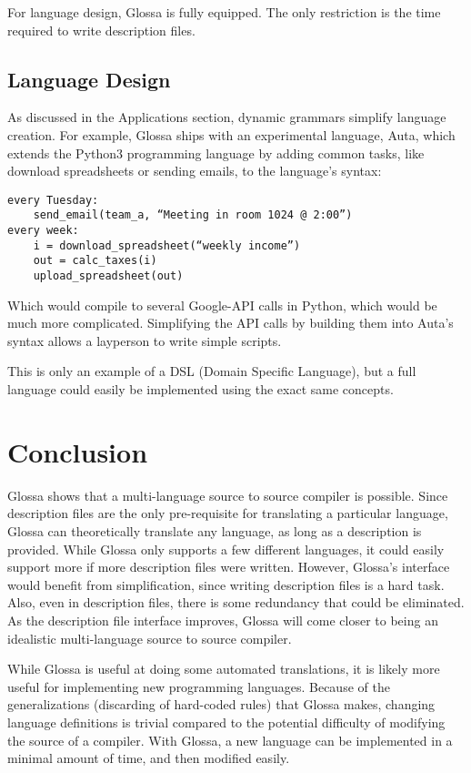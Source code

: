\documentclass{article}
\begin{document}
For language design, Glossa is fully equipped. The only restriction is the time required to write description files.

\subsection{Language Design}

As discussed in the Applications section, dynamic grammars simplify language creation.
For example, Glossa ships with an experimental language, Auta, which extends the Python3 programming language by adding common tasks, like download spreadsheets or sending emails, to the language's syntax:

\lstset{language=Python}
\begin{lstlisting}
every Tuesday:
    send_email(team_a, “Meeting in room 1024 @ 2:00”)
every week:
    i = download_spreadsheet(“weekly income”)
    out = calc_taxes(i)
    upload_spreadsheet(out)
\end{lstlisting}
Which would compile to several Google-API calls in Python, which would be much more complicated. 
Simplifying the API calls by building them into Auta's syntax allows a layperson to write simple scripts.

This is only an example of a DSL (Domain Specific Language), but a full language could easily be implemented using the exact same concepts.

\section{Conclusion}

Glossa shows that a multi-language source to source compiler is possible. 
Since description files are the only pre-requisite for translating a particular language, Glossa can theoretically translate any language, as long as a description is provided.
While Glossa only supports a few different languages, it could easily support more if more description files were written.
However, Glossa's interface would benefit from simplification, since writing description files is a hard task. 
Also, even in description files, there is some redundancy that could be eliminated.
As the description file interface improves, Glossa will come closer to being an idealistic multi-language source to source compiler.

While Glossa is useful at doing some automated translations, it is likely more useful for implementing new programming languages.
Because of the generalizations (discarding of hard-coded rules) that Glossa makes, changing language definitions is trivial compared to the potential difficulty of modifying the source of a compiler.
With Glossa, a new language can be implemented in a minimal amount of time, and then modified easily.
\end{document}
